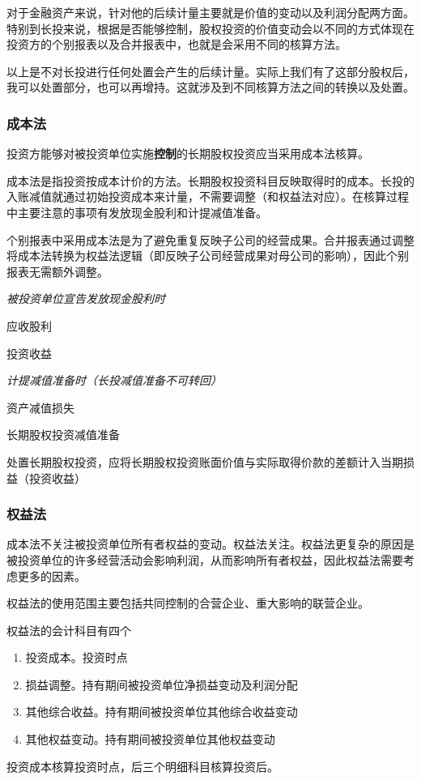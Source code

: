 \documentclass[UTF8,12pt]{ctexart}
\newenvironment{Dr}{%
	\begin{list}{}%
		{
			\setlength{\leftmargin}{2em}
			\setlength{\labelwidth}{2em}
			\setlength{\labelsep}{0pt}
			\setlength{\itemindent}{0pt}
			\setlength{\listparindent}{0pt}
			\setlength{\parsep}{0pt}
			\setlength{\topsep}{0pt}
		}
		\item[\textbf{借：}]
	}{%
	\end{list}
}
\newenvironment{Cr}{%
	\begin{list}{}%
		{
			\setlength{\leftmargin}{3em}
			\setlength{\labelwidth}{2em}
			\setlength{\labelsep}{0pt}
			\setlength{\itemindent}{0pt}
			\setlength{\listparindent}{0pt}
			\setlength{\parsep}{0pt}
			\setlength{\topsep}{0pt}
		}
		\item[\textbf{贷：}]
	}{%
	\end{list}
}
\numberwithin{equation}{section} %
\numberwithin{figure}{section}
\numberwithin{table}{section}
\begin{document}
	对于金融资产来说，针对他的后续计量主要就是价值的变动以及利润分配两方面。特别到长投来说，根据是否能够控制，股权投资的价值变动会以不同的方式体现在投资方的个别报表以及合并报表中，也就是会采用不同的核算方法。
	
	以上是不对长投进行任何处置会产生的后续计量。实际上我们有了这部分股权后，我可以处置部分，也可以再增持。这就涉及到不同核算方法之间的转换以及处置。
	
	\subsubsection{成本法}
	投资方能够对被投资单位实施\textbf{控制}的长期股权投资应当采用成本法核算。
	
	成本法是指投资按成本计价的方法。长期股权投资科目反映取得时的成本。长投的入账减值就通过初始投资成本来计量，不需要调整（和权益法对应）。在核算过程中主要注意的事项有发放现金股利和计提减值准备。
	
	个别报表中采用成本法是为了避免重复反映子公司的经营成果。合并报表通过调整将成本法转换为权益法逻辑（即反映子公司经营成果对母公司的影响），因此个别报表无需额外调整。
	
	\textit{被投资单位宣告发放现金股利时}
	
	\begin{Dr}
		应收股利
	\end{Dr}
	\begin{Cr}
		投资收益
	\end{Cr}
	
	\textit{计提减值准备时（长投减值准备不可转回）}
	
	\begin{Dr}
		资产减值损失
	\end{Dr}
	\begin{Cr}
		长期股权投资减值准备
	\end{Cr}
	
	处置长期股权投资，应将长期股权投资账面价值与实际取得价款的差额计入当期损益（投资收益）
	
	\subsubsection{权益法}
	成本法不关注被投资单位所有者权益的变动。权益法关注。权益法更复杂的原因是被投资单位的许多经营活动会影响利润，从而影响所有者权益，因此权益法需要考虑更多的因素。
	
	
	权益法的使用范围主要包括共同控制的合营企业、重大影响的联营企业。
	
	权益法的会计科目有四个
	\begin{enumerate}
		\item 投资成本。投资时点
		
		\item 损益调整。持有期间被投资单位净损益变动及利润分配
		
		\item 其他综合收益。持有期间被投资单位其他综合收益变动
		
		\item 其他权益变动。持有期间被投资单位其他权益变动
	\end{enumerate}
	投资成本核算投资时点，后三个明细科目核算投资后。
	
\end{document}
